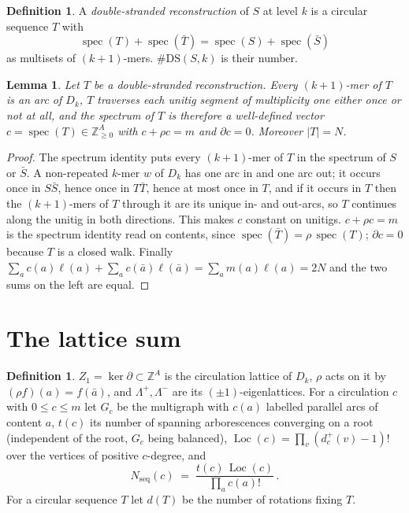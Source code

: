 \documentclass[11pt]{article}
\theoremstyle{plain}
\newtheorem{lemma}[theorem]{Lemma}
\theoremstyle{definition}
\newtheorem{definition}[theorem]{Definition}
\theoremstyle{remark}
\newcommand{\Z}{\mathbb{Z}}
\newcommand{\spec}{\operatorname{spec}}
\newcommand{\Loc}{\operatorname{Loc}}
\newcommand{\Nseq}{N_{\mathrm{seq}}}
\newcommand{\DS}{\mathrm{DS}}
\newcommand{\Lm}{\Lambda^{-}}
\newcommand{\Lp}{\Lambda^{+}}
\begin{document}
\begin{definition}\label{def:ds}
A \emph{double-stranded reconstruction} of $S$ at level $k$ is a circular sequence $T$ with
\[
  \spec(T)+\spec(\bar T)=\spec(S)+\spec(\bar S)
\]
as multisets of $(k{+}1)$-mers. $\#\DS(S,k)$ is their number.
\end{definition}

\begin{lemma}\label{lem:spectrum}
Let $T$ be a double-stranded reconstruction. Every $(k{+}1)$-mer of $T$ is an arc of $D_k$,
$T$ traverses each unitig segment of multiplicity one either once or not at all, and the
spectrum of $T$ is therefore a well-defined vector $c=\spec(T)\in\Z_{\ge0}^A$ with
$c+\rho c=m$ and $\partial c=0$. Moreover $|T|=N$.
\end{lemma}

\begin{proof}
The spectrum identity puts every $(k{+}1)$-mer of $T$ in the spectrum of $S$ or $\bar S$. A
non-repeated $k$-mer $w$ of $D_k$ has one arc in and one arc out; it occurs once in $S\bar S$,
hence once in $T\bar T$, hence at most once in $T$, and if it occurs in $T$ then the
$(k{+}1)$-mers of $T$ through it are its unique in- and out-arcs, so $T$ continues along the
unitig in both directions. This makes $c$ constant on unitigs. $c+\rho c=m$ is the spectrum
identity read on contents, since $\spec(\bar T)=\rho\,\spec(T)$; $\partial c=0$ because $T$ is
a closed walk. Finally $\sum_a c(a)\ell(a)+\sum_a c(\bar a)\ell(\bar a)=\sum_a m(a)\ell(a)=2N$
and the two sums on the left are equal.
\end{proof}

\section{The lattice sum}

\begin{definition}
$Z_1=\ker\partial\subset\Z^A$ is the circulation lattice of $D_k$, $\rho$ acts on it by
$(\rho f)(a)=f(\bar a)$, and $\Lp,\Lm$ are its $(\pm1)$-eigenlattices. For a circulation $c$
with $0\le c\le m$ let $G_c$ be the multigraph with $c(a)$ labelled parallel arcs of content
$a$, $t(c)$ its number of spanning arborescences converging on a root (independent of the
root, $G_c$ being balanced), $\Loc(c)=\prod_v(d^+_c(v)-1)!$ over the vertices of positive
$c$-degree, and
\[
  \Nseq(c)\;=\;\frac{t(c)\,\Loc(c)}{\prod_a c(a)!}\,.
\]
For a circular sequence $T$ let $d(T)$ be the number of rotations fixing $T$.
\end{definition}
\end{document}
